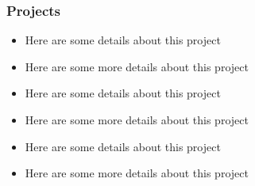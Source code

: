 \documentclass{mxresume}
\begin{document}
\subsubsection*{\Large{Projects}}
\begin{itemize}[leftmargin=5mm]
\setlength{\itemsep}{0mm}
\item Here are some details about this project
\item Here are some more details about this project
\end{itemize}
\begin{itemize}[leftmargin=5mm]
\setlength{\itemsep}{0mm}
\item Here are some details about this project
\item Here are some more details about this project
\end{itemize}
\begin{itemize}[leftmargin=5mm]
\setlength{\itemsep}{0mm}
\item Here are some details about this project
\item Here are some more details about this project
\end{itemize}
\end{document}
